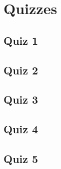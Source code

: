\section{Quizzes}
\subsection{Quiz 1}
\subsection{Quiz 2}
\subsection{Quiz 3}
\subsection{Quiz 4}
\subsection{Quiz 5}

